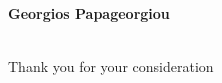 \documentclass[a4paper]{article}
\newcommand{\name}[1]{
	\begin{flushleft}
		{\Huge{\textbf{#1}}}
	\end{flushleft}
}
\newcommand{\quality}[1]{
	\begin{flushleft}
		{\Large{\textcolor{color2}{\textsf{#1}}}}
	\end{flushleft}
}
\begin{document}
	\name{Georgios Papageorgiou}
	\vspace{-18pt}

	\quality{}
	\medskip
	
	
	\bigskip

	\noindent
	
	\par
	\blindtest \\
	
	\noindent
	Thank you for your consideration
\end{document}
